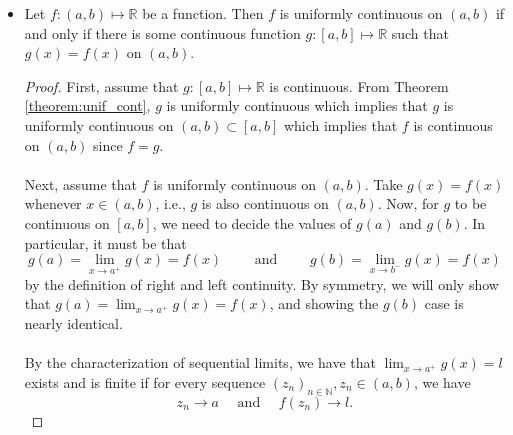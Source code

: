 \documentclass{article}
\newcommand{\R}{\mathbb{R}}
\newcommand{\N}{\mathbb{N}}
\newcommand{\seq}[2]{(#1_{#2})_{#2 \in \N}}
\newcommand{\?}{\stackrel{?}{=}}
\theoremstyle{definition} %
\begin{document}
\begin{itemize}
\begin{proof}
              We now must show that $l_1 = l_2$. Consider $|x_{m_k} - y_{m_k}| \leq \nicefrac{1}{m_k}$. As $k \to \infty$, the difference $(x_{m_k} - y_{m_k}) \rightarrow 0$ and $\nicefrac{1}{m_k} \rightarrow 0$. Therefore, $\lim_{k \to \infty} x_{n_k} = l_1 = l_2 = \lim_{k \to \infty} y_{m_k}$. \\\\
              Now, we know $f$ is continuous, so $\lim_{k \to \infty} f(x_{m_k}) = f(l_1)$ and $\lim_{k \to \infty} f(y_{m_k}) = f(l_2)$ and $l_1 = l_2$. Together, these two things imply that $f(l_1) = f(l_2)$. This means that $\lim_{k \to \infty}|f(x_{m_k} - y_{m_k})| = 0$ which contradicts the assumption that $|f(x_{m_k}) - f(y_{m_k})| \geq \varepsilon_0$. Therefore, our initial assumption is false and $f$ must be uniformly continuous.
          \end{proof}
    \item[]
          \begin{theorem}
              Let $f: (a, b) \mapsto \R$ be a function. Then $f$ is uniformly continuous on $(a, b)$ if and only if there is some continuous function $g: [a, b] \mapsto \R$ such that $g(x) = f(x)$ on $(a, b)$.
          \end{theorem}
          \begin{proof}
              First, assume that $g: [a, b] \mapsto \R$ is continuous. From Theorem \ref{theorem:unif_cont}, $g$ is uniformly continuous which implies that $g$ is uniformly continuous on $(a, b) \subset [a, b]$ which implies that $f$ is continuous on $(a, b)$ since $f = g$. \\\\
              Next, assume that $f$ is uniformly continuous on $(a, b)$. Take $g(x) = f(x)$ whenever $x \in (a, b)$, i.e., $g$ is also continuous on $(a, b)$. Now, for $g$ to be continuous on $[a, b]$, we need to decide the values of $g(a)$ and $g(b)$. In particular, it must be that
              $$g(a) = \lim_{x \to a^+} g(x) = f(x) \qquad \text{ and } \qquad g(b) = \lim_{x \to b^-} g(x) = f(x)$$
              by the definition of right and left continuity. By symmetry, we will only show that $g(a) = \lim_{x \to a^+} g(x) = f(x)$, and showing the $g(b)$ case is nearly identical. \\\\
              By the characterization of sequential limits, we have that $\lim_{x \to a^+} g(x) = l$ exists and is finite if for every sequence $\seq{z}{n}, z_n \in (a, b)$, we have
              $$z_n \rightarrow a \quad \text{ and } \quad f(z_n) \rightarrow l.$$

\end{proof}
\end{itemize}
\end{document}
